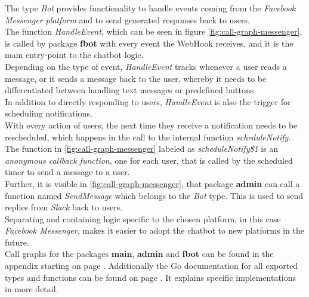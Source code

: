 The type \emph{Bot} provides functionality to handle events coming from the \emph{Facebook Messenger platform}
and to send generated responses back to users.
\\
The function \emph{HandleEvent}, which can be seen in figure \ref{fig:call-graph-messenger},
is called by package \textbf{fbot} with every event the WebHook receives,
and it is the main entry-point to the chatbot logic.
\\
Depending on the type of event,
\emph{HandleEvent} tracks whenever a user reads a message,
or it sends a message back to the user,
whereby it needs to be differentiated between handling text messages
or predefined buttons.
\\

In addition to directly responding to users,
\emph{HandleEvent} is also the trigger for scheduling notifications.
\\
With every action of users, the next time they receive a notification needs to be rescheduled,
which happens in the call to the internal function \emph{scheduleNotify}.
The function in \ref{fig:call-graph-messenger} labeled as \emph{scheduleNotify\$1} is an \emph{anonymous callback function},
one for each user, that is called by the scheduled timer to send a message to a user.
\\

Further, it is visible in \ref{fig:call-graph-messenger},
that package \textbf{admin} can call a function named \emph{SendMessage} which belongs to the \emph{Bot} type.
This is used to send replies from \emph{Slack} back to users.
\\

Separating and containing logic specific to the chosen platform, in this case \emph{Facebook Messenger},
makes it easier to adopt the chatbot to new platforms in the future.
\\

Call graphs for the packages \textbf{main}, \textbf{admin} and \textbf{fbot} can be found in the appendix starting on page \pageref{a:call-graph}.
Additionally the Go documentation for all exported types and functions can be found on page \pageref{a:docs}.
It explains specific implementations in more detail.
\\


